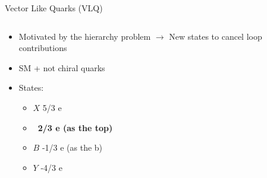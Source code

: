 \begin{frame}{Vector Like Quarks (VLQ)}
\vspace{-.3cm}
\begin{columns}

\begin{column}{.40\textwidth}
\begin{block}{}
\begin{itemize}\scriptsize
\item Motivated by the hierarchy problem $\to$ New states to cancel loop contributions
\item SM + not chiral quarks
\item States:
  \begin{itemize}\scriptsize
  \item $X$ 5/3 e
  \item \textbf{\Tp~2/3 e (as the top)}
  \item $B$ -1/3 e (as the b)
  \item $Y$ -4/3 e
  \end{itemize}
\end{itemize}
\end{block}
\end{column}


\end{columns}
\end{frame}
